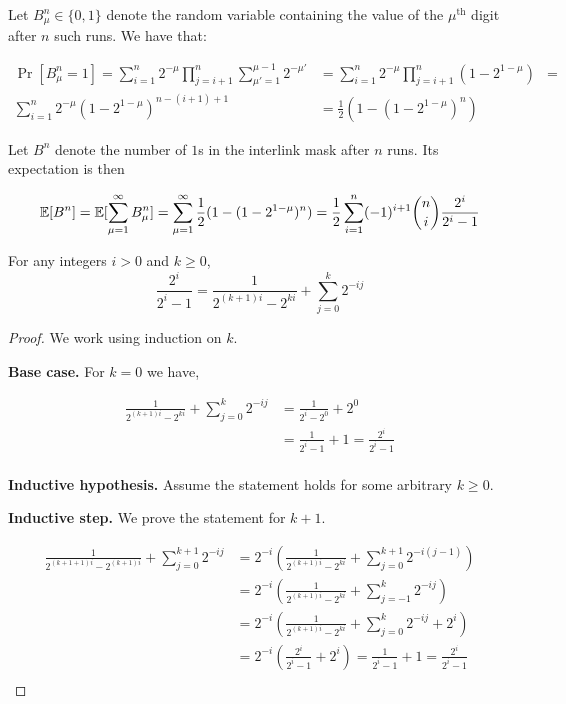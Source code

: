 Let $B^n_\mu \in \{0, 1\}$ denote the random variable containing the value of
the $\mu^{\text{th}}$ digit after $n$ such runs. We have that:

\begin{align*}
\Pr[B^n_\mu = 1] =
\sum_{i = 1}^n 2^{-\mu} \prod_{j = i + 1}^n \sum_{\mu' = 1}^{\mu - 1} 2^{-\mu'} &= \sum_{i = 1}^n 2^{-\mu} \prod_{j = i + 1}^n (1 - 2^{1 - \mu}) &=\\
\sum_{i = 1}^n 2^{-\mu} (1 - 2^{1 -\mu})^{n - (i + 1) + 1} &= \frac{1}{2} (1 - (1 - 2^{1 - \mu})^n)
\end{align*}

Let $B^n$ denote the number of $1$s in the interlink mask after $n$ runs. Its
expectation is then

\[
  \operatorname{\mathbb{E}}[B^n] = \operatorname{\mathbb{E}}[\sum_{\mu = 1}^\infty B^n_\mu] =
  \sum_{\mu = 1}^\infty \frac{1}{2} (1 - (1 - 2^{1 - \mu})^n) =
  \frac{1}{2} \sum_{i = 1}^n (-1)^{i+1} {n \choose i} \frac{2^i}{2^i - 1}
\]

\begin{lemma}
  For any integers $i > 0$ and $k \ge 0$,
  \[
    \frac{2^i}{2^i-1} = \frac{1}{2^{(k+1)i}-2^{ki}} + \sum_{j=0}^k 2^{-ij}
  \]
\end{lemma}
\begin{proof}
  We work using induction on $k$.

  \noindent
  \textbf{Base case.}
  For $k=0$ we have,

  \begin{align*}
    \frac{1}{2^{(k+1)i}-2^{ki}} + \sum_{j=0}^k 2^{-ij}
    &= \frac{1}{2^i-2^0} + 2^0 \\
    &= \frac{1}{2^i-1} + 1 = \frac{2^i}{2^i-1} \\
  \end{align*}

  \noindent
  \textbf{Inductive hypothesis.}
  Assume the statement holds for some arbitrary $k \ge 0$.

  \noindent
  \textbf{Inductive step.}
  We prove the statement for $k+1$.

  \begin{align*}
    \frac{1}{2^{(k+1+1)i}-2^{(k+1)i}} + \sum_{j=0}^{k+1} 2^{-ij}
    &= 2^{-i} (\frac{1}{2^{(k+1)i}-2^{ki}} + \sum_{j=0}^{k+1} 2^{-i(j-1)}) \\
    &= 2^{-i} (\frac{1}{2^{(k+1)i}-2^{ki}} + \sum_{j=-1}^{k} 2^{-ij}) \\
    &= 2^{-i} (\frac{1}{2^{(k+1)i}-2^{ki}} + \sum_{j=0}^{k} 2^{-ij} + 2^i) \\
    &= 2^{-i} (\frac{2^i}{2^i-1} + 2^i) = \frac{1}{2^i-1} + 1 = \frac{2^i}{2^i-1} \\
  \end{align*}
\end{proof}

